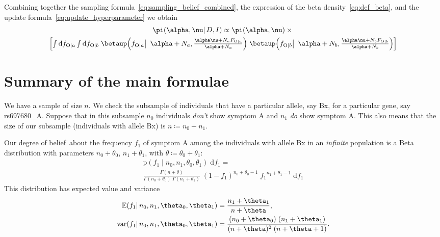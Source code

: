 \documentclass[\ifafour a4paper,12pt,\else a5paper,10pt,\fi%
onecolumn,oneside,article,%
british%
]{memoir}
\theoremstyle{remark}
\theoremstyle{innote}
\newcommand*{\di}{\mathrm{d}}%
\newcommand*{\defd}{\coloneqq}
\newcommand*{\pf}{\mathrm{p}}%
\renewcommand*{\|}{\mathpunct{|}}
\newcommand*{\bigcond}{\mathpunct{\big|\ }}%
\newcommand*{\tint}{\begingroup\textstyle\int\endgroup\nolimits}
\newcommand*{\E}{\mathrm{E}}
\DeclarePairedDelimiter\expp{(}{)}
\newcommand*{\expe}{\E\expp}%
\DeclareMathOperator{\var}{var}
\newcommand*{\dob}{degree of belief}
\newcommand*{\yD}{D}
\newcommand*{\yI}{I}
\newcommand*{\ya}{a}
\newcommand*{\yb}{b}
\newcommand*{\ysA}{\textrm{O}}%
\newcommand*{\dbeta}{\betaup}
\newcommand*{\dA}{\pi}
\newcommand*{\yA}{\alpha}
\newcommand*{\yq}{\nu}
\begin{document}
Combining together the sampling
formula~\eqref{eq:sampling_belief_combined}, the expression of the beta
density~\eqref{eq:def_beta}, and the update
formula~\eqref{eq:update_hyperparameter} we obtain
\begin{multline}
  \label{eq:parameter_posterior_first}
  \dA(\yA,\yq \|\yD, \yI) \propto
    \dA(\yA,\yq) \times{}\\
  \Bigl[   \tint\di f_{\ysA\|\ya}\tint\di f_{\ysA\|\yb}\;
  \dbeta\Bigl(f_{\ysA\|\ya} \bigcond \yA+N_{\ya},
  \frac{\yA\yq+N_{\ya}F_{\ysA\|\ya}}{\yA+N_{\ya}}
    \Bigl)\;
  \dbeta\Bigl(f_{\ysA\|\yb} \bigcond \yA+N_{\yb},
  \frac{\yA\yq+N_{\yb}F_{\ysA\|\yb}}{\yA+N_{\yb}}
    \Bigr)
       \Bigr]
\end{multline}


\section{Summary of the main formulae}

We have a sample of size $n$. We check the subsample of individuals that
have a particular allele, say Bx, for a particular gene, say rs697680\_A.
Suppose that in this subsample $n_0$ individuals \emph{don't} show symptom
A and $n_1$ \emph{do} show symptom A. This also means that the size of our
subsample (individuals with allele Bx) is $n \defd n_0+n_1$.

Our \dob\ about the frequency $f_1$ of symptom A among the individuals with
allele Bx in an \emph{infinite} population is a Beta distribution with
parameters $n_0+\theta_0$, $n_1+\theta_1$, with
$\theta \defd \theta_0+\theta_1$:
\begin{multline}
  \label{eq:beta_fr}
  \pf(f_1 \| n_0,n_1,\theta_0,\theta_1)\;\di f_1 ={}\\
  \frac{\Gamma(n+\theta)}{\Gamma(n_0+\theta_0)\;\Gamma(n_1+\theta_1)}
  \; (1-f_1)^{n_0+\theta_0-1}\;{f_1}^{n_1+\theta_1-1} \;\di f_1
\end{multline}
This distribution has expected value and variance
\begin{equation}
  \label{eq:exp_value}
  \begin{split}
  \expe{f_1 \| n_0, n_1, \theta_0,\theta_1} &= \frac{n_1+\theta_1}{n+\theta},
  \\
  \var(f_1 \|  n_0, n_1, \theta_0,\theta_1) &=
  \frac{(n_0+\theta_0)\;(n_1+\theta_1)}{(n+\theta)^2\;(n+\theta+1)}.
\end{split}
\end{equation}
\end{document}
